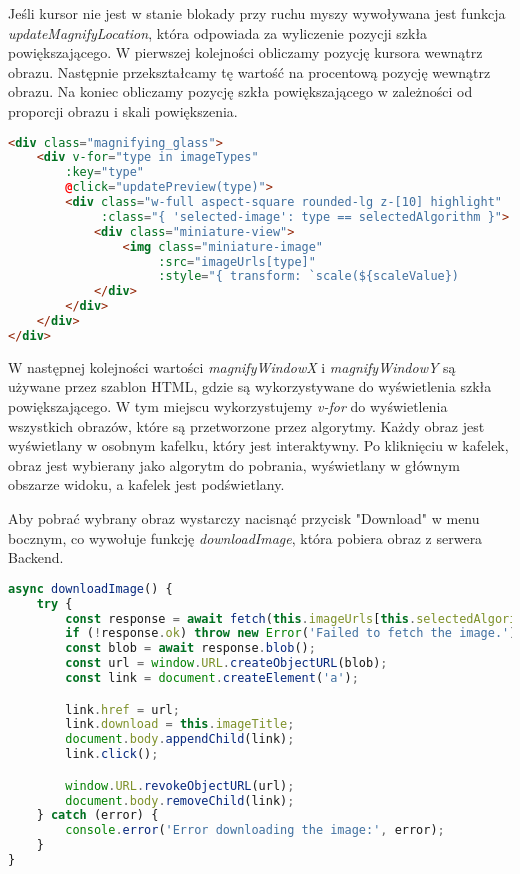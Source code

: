 Jeśli kursor nie jest w stanie blokady przy ruchu myszy wywoływana jest funkcja \textit{updateMagnifyLocation}, która odpowiada za wyliczenie pozycji szkła powiększającego. W pierwszej kolejności obliczamy pozycję kursora wewnątrz obrazu. Następnie przekształcamy tę wartość na procentową pozycję wewnątrz obrazu. Na koniec obliczamy pozycję szkła powiększającego w zależności od proporcji obrazu i skali powiększenia.

\begin{lstlisting}[language=HTML, caption=Implementacja szkła powiększającego (HTML)., label={lst:zoom2}]
<div class="magnifying_glass">
    <div v-for="type in imageTypes" 
        :key="type" 
        @click="updatePreview(type)">
        <div class="w-full aspect-square rounded-lg z-[10] highlight" 
             :class="{ 'selected-image': type == selectedAlgorithm }">
            <div class="miniature-view">
                <img class="miniature-image" 
                     :src="imageUrls[type]" 
                     :style="{ transform: `scale(${scaleValue})              translate(${-magnifyWindowX * 100}%, ${-magnifyWindowY * 100}%)`}">
            </div>    
        </div>
    </div>
</div>
\end{lstlisting}

W następnej kolejności wartości \textit{magnifyWindowX} i \textit{magnifyWindowY} są używane przez szablon HTML, gdzie są wykorzystywane do wyświetlenia szkła powiększającego. W tym miejscu wykorzystujemy \textit{v-for} do wyświetlenia wszystkich obrazów, które są przetworzone przez algorytmy. Każdy obraz jest wyświetlany w osobnym kafelku, który jest interaktywny. Po kliknięciu w kafelek, obraz jest wybierany jako algorytm do pobrania, wyświetlany w głównym obszarze widoku, a kafelek jest podświetlany.

Aby pobrać wybrany obraz wystarczy nacisnąć przycisk "Download" w menu bocznym, co wywołuje funkcję \textit{downloadImage}, która pobiera obraz z serwera Backend.

\begin{lstlisting}[language=TypeScript, caption=Pobieranie obrazu., label={lst:download}]
async downloadImage() {
    try {
        const response = await fetch(this.imageUrls[this.selectedAlgorithm]);
        if (!response.ok) throw new Error('Failed to fetch the image.');
        const blob = await response.blob();
        const url = window.URL.createObjectURL(blob);
        const link = document.createElement('a');

        link.href = url;
        link.download = this.imageTitle;
        document.body.appendChild(link);
        link.click();

        window.URL.revokeObjectURL(url);
        document.body.removeChild(link);
    } catch (error) {
        console.error('Error downloading the image:', error);
    }
}
\end{lstlisting}

